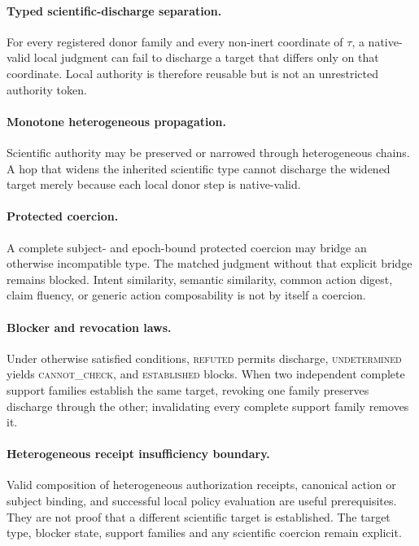 \paragraph{Typed scientific-discharge separation.}
For every registered donor family and every non-inert coordinate of $\tau$, a native-valid local judgment can fail to discharge a target that differs only on that coordinate. Local authority is therefore reusable but is not an unrestricted authority token.

\paragraph{Monotone heterogeneous propagation.}
Scientific authority may be preserved or narrowed through heterogeneous chains. A hop that widens the inherited scientific type cannot discharge the widened target merely because each local donor step is native-valid.

\paragraph{Protected coercion.}
A complete subject- and epoch-bound protected coercion may bridge an otherwise incompatible type. The matched judgment without that explicit bridge remains blocked. Intent similarity, semantic similarity, common action digest, claim fluency, or generic action composability is not by itself a coercion.

\paragraph{Blocker and revocation laws.}
Under otherwise satisfied conditions, \textsc{refuted} permits discharge, \textsc{undetermined} yields \textsc{cannot\_check}, and \textsc{established} blocks. When two independent complete support families establish the same target, revoking one family preserves discharge through the other; invalidating every complete support family removes it.

\paragraph{Heterogeneous receipt insufficiency boundary.}
Valid composition of heterogeneous authorization receipts, canonical action or subject binding, and successful local policy evaluation are useful prerequisites. They are not proof that a different scientific target is established. The target type, blocker state, support families and any scientific coercion remain explicit.

